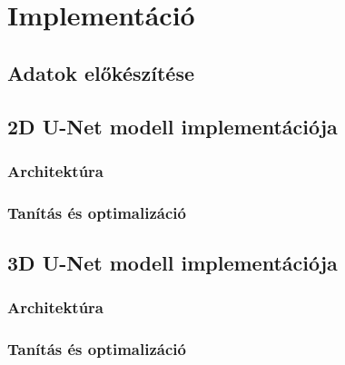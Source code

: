 \chapter{Implementáció}  %

\section{Adatok előkészítése}  %

\section{2D U-Net modell implementációja}  %

\subsection{Architektúra}  %

\subsection{Tanítás és optimalizáció}  %

\section{3D U-Net modell implementációja}  %

\subsection{Architektúra}  %

\subsection{Tanítás és optimalizáció}  %

